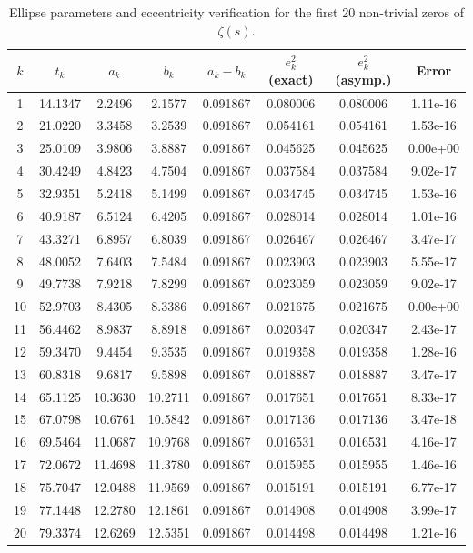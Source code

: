 
\begin{table}[htbp]
\centering
\caption{Ellipse parameters and eccentricity verification for the first 20 non-trivial zeros of $\zeta(s)$.}
\label{tab:zeros}
\begin{tabular}{|c|c|c|c|c|c|c|c|}
\hline
$k$ & $t_k$ & $a_k$ & $b_k$ & $a_k-b_k$ & $e_k^2$ (exact) & $e_k^2$ (asymp.) & Error \\
\hline
1 & 14.1347 & 2.2496 & 2.1577 & 0.091867 & 0.080006 & 0.080006 & 1.11e-16 \\
2 & 21.0220 & 3.3458 & 3.2539 & 0.091867 & 0.054161 & 0.054161 & 1.53e-16 \\
3 & 25.0109 & 3.9806 & 3.8887 & 0.091867 & 0.045625 & 0.045625 & 0.00e+00 \\
4 & 30.4249 & 4.8423 & 4.7504 & 0.091867 & 0.037584 & 0.037584 & 9.02e-17 \\
5 & 32.9351 & 5.2418 & 5.1499 & 0.091867 & 0.034745 & 0.034745 & 1.53e-16 \\
6 & 40.9187 & 6.5124 & 6.4205 & 0.091867 & 0.028014 & 0.028014 & 1.01e-16 \\
7 & 43.3271 & 6.8957 & 6.8039 & 0.091867 & 0.026467 & 0.026467 & 3.47e-17 \\
8 & 48.0052 & 7.6403 & 7.5484 & 0.091867 & 0.023903 & 0.023903 & 5.55e-17 \\
9 & 49.7738 & 7.9218 & 7.8299 & 0.091867 & 0.023059 & 0.023059 & 9.02e-17 \\
10 & 52.9703 & 8.4305 & 8.3386 & 0.091867 & 0.021675 & 0.021675 & 0.00e+00 \\
11 & 56.4462 & 8.9837 & 8.8918 & 0.091867 & 0.020347 & 0.020347 & 2.43e-17 \\
12 & 59.3470 & 9.4454 & 9.3535 & 0.091867 & 0.019358 & 0.019358 & 1.28e-16 \\
13 & 60.8318 & 9.6817 & 9.5898 & 0.091867 & 0.018887 & 0.018887 & 3.47e-17 \\
14 & 65.1125 & 10.3630 & 10.2711 & 0.091867 & 0.017651 & 0.017651 & 8.33e-17 \\
15 & 67.0798 & 10.6761 & 10.5842 & 0.091867 & 0.017136 & 0.017136 & 3.47e-18 \\
16 & 69.5464 & 11.0687 & 10.9768 & 0.091867 & 0.016531 & 0.016531 & 4.16e-17 \\
17 & 72.0672 & 11.4698 & 11.3780 & 0.091867 & 0.015955 & 0.015955 & 1.46e-16 \\
18 & 75.7047 & 12.0488 & 11.9569 & 0.091867 & 0.015191 & 0.015191 & 6.77e-17 \\
19 & 77.1448 & 12.2780 & 12.1861 & 0.091867 & 0.014908 & 0.014908 & 3.99e-17 \\
20 & 79.3374 & 12.6269 & 12.5351 & 0.091867 & 0.014498 & 0.014498 & 1.21e-16 \\
\hline
\end{tabular}
\end{table}
